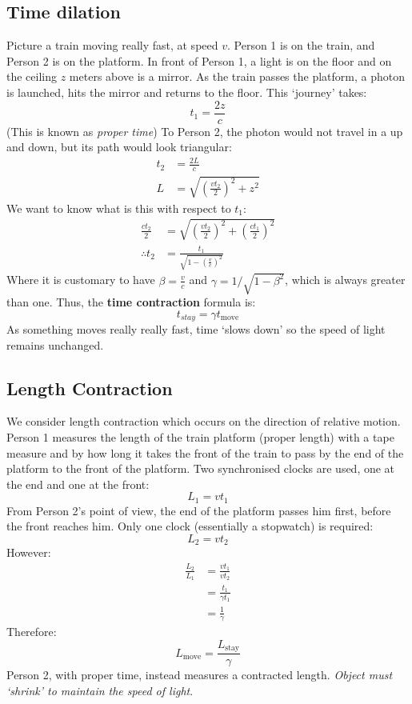 \documentclass[12pt]{article}
\begin{document}
\subsection{Time dilation}
Picture a train moving really fast, at speed $v$. Person 1 is on the train, and Person 2 is on the platform. In front of Person 1, a light is on the floor and on the ceiling $z$ meters above is a mirror. As the train passes the platform, a photon is launched, hits the mirror and returns to the floor. This `journey' takes:
\[ t_1 = \frac{2z}{c}\]
(This is known as \textit{proper time}) To Person 2, the photon would not travel in a up and down, but its path would look triangular:
\begin{align*}
    t_2 &= \frac{2L}{c}\\
    L &= \sqrt{\left(\frac{vt_2}{2}\right)^2 + z^2}
\end{align*}
We want to know what is this with respect to $t_1$:
\begin{align*}
    \frac{ct_2}{2} &= \sqrt{\left(\frac{vt_2}{2}\right)^2 + \left(\frac{ct_1}{2}\right)^2}\\
    \therefore t_2 &= \frac{t_1}{\sqrt{1-\left(\frac{v}{c}\right)^2}}
\end{align*}
Where it is customary to have $\beta = \frac{v}{c}$ and $\gamma = 1/\sqrt{1-\beta^2}$, which is always greater than one. Thus, the \textbf{time contraction} formula is:
\[ \boxed{t_{stay} = \gamma t_\text{move}}\]
As something moves really really fast, time `slows down' so the speed of light remains unchanged. 

\subsection{Length Contraction}
We consider length contraction which occurs on the direction of relative motion. Person 1 measures the length of the train platform (proper length) with a tape measure and by how long it takes the front of the train to pass by the end of the platform to the front of the platform. Two synchronised clocks are used, one at the end and one at the front:
\[ L_1 = vt_1\]
From Person 2's point of view, the end of the platform passes him first, before the front reaches him. Only one clock (essentially a stopwatch) is required:
\[ L_2 = vt_2\]
However:
\begin{align*}
    \frac{L_2}{L_1} &= \frac{vt_1}{vt_2}\\
    &= \frac{t_1}{\gamma t_1} \\
    &= \frac{1}{\gamma}
\end{align*}
Therefore:
\[\boxed{L_\text{move} = \frac{L_\text{stay}}{\gamma}}\]
Person 2, with proper time, instead measures a contracted length. \textit{Object must `shrink' to maintain the speed of light}.
\end{document}
